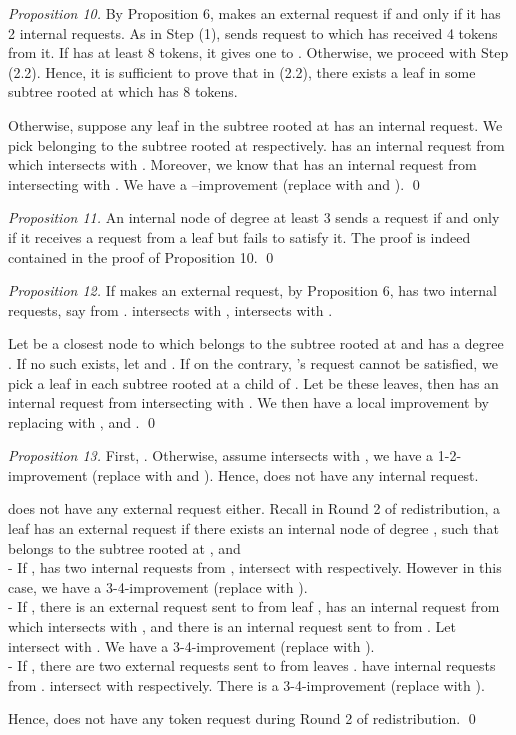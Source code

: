 \documentclass[runningheads,a4paper]{llncs}
\numberwithin{equation}{section}
\begin{document}
\begin{proof}[Proposition 10]
By Proposition 6,  makes an external request if and only if it has 2 internal requests. As in Step (1),  sends request to  which has received 4 tokens from it. If  has at least 8 tokens, it gives one to . Otherwise, we proceed with Step (2.2). Hence, it is sufficient to prove that in (2.2), there exists a leaf in some subtree rooted at  which has 8 tokens.

Otherwise, suppose any leaf in the subtree rooted at  has an internal request. We pick  belonging to the subtree rooted at  respectively.  has an internal request from  which intersects with . Moreover, we know that  has an internal request from  intersecting with . We have a --improvement (replace  with  and ). \qed
\end{proof}

\begin{proof}[Proposition 11]
An internal node of degree at least 3 sends a request if and only if it receives a request from a leaf but fails to satisfy it. The proof is indeed contained in the proof of Proposition 10. \qed
\end{proof}


\begin{proof}[Proposition 12]
If  makes an external request, by Proposition 6,  has two internal requests, say from .  intersects with ,  intersects with .

Let  be a closest node to  which belongs to the subtree rooted at  and has a degree . If no such  exists, let  and . If on the contrary, 's request cannot be satisfied, we pick a leaf in each subtree rooted at a child of . Let  be these leaves, then  has an internal request from  intersecting with . We then have a local improvement by replacing  with ,  and . \qed
\end{proof}


\begin{proof}[Proposition 13]
First, . Otherwise, assume  intersects with , we have a 1-2-improvement (replace  with  and ). Hence,  does not have any internal request.

 does not have any external request either. Recall in Round 2 of redistribution, a leaf has an external request if there exists an internal node  of degree , such that  belongs to the subtree rooted at , and \\
- If ,  has two internal requests from ,  intersect with  respectively. However in this case, we have a 3-4-improvement (replace  with ).\\
- If , there is an external request sent to  from leaf ,  has an internal request from  which intersects with , and there is an internal request sent to  from . Let  intersect with . We have a 3-4-improvement (replace  with ). \\
- If , there are two external requests sent to  from leaves .  have internal requests from .  intersect with  respectively. There is a 3-4-improvement (replace  with ).

Hence,  does not have any token request during Round 2 of redistribution. \qed
\end{proof}
\end{document}
